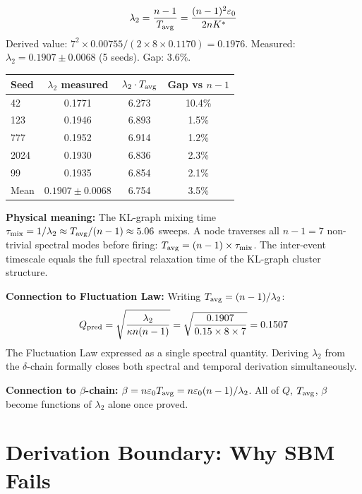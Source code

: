 \documentclass[12pt, a4paper]{article}
\begin{document}
\begin{keybox}[title={Spectral--Temporal Identity (Candidate, 3.6\% gap, 5 seeds)}]
\[
  \lambda_2 = \frac{n-1}{T_{\rm avg}} = \frac{(n-1)^2\varepsilon_0}{2nK^*}
\]
Derived value: $7^2\times 0.00755/(2\times 8\times 0.1170) = 0.1976$.
Measured: $\lambda_2=0.1907\pm 0.0068$ (5 seeds). Gap: 3.6\%.

\begin{center}
\renewcommand{\arraystretch}{1.5}
\begin{tabular}{lccc}
\toprule
Seed & $\lambda_2$ measured & $\lambda_2\cdot T_{\rm avg}$ & Gap vs $n-1$\\
\midrule
42   & 0.1771 & 6.273 & 10.4\% \\
123  & 0.1946 & 6.893 & 1.5\%  \\
777  & 0.1952 & 6.914 & 1.2\%  \\
2024 & 0.1930 & 6.836 & 2.3\%  \\
99   & 0.1935 & 6.854 & 2.1\%  \\
\midrule
Mean & $0.1907\pm 0.0068$ & 6.754 & 3.5\% \\
\bottomrule
\end{tabular}
\end{center}
\end{keybox}

\textbf{Physical meaning:} The KL-graph mixing time $\tau_{\rm mix}=1/\lambda_2\approx T_{\rm avg}/(n-1)\approx 5.06$ sweeps. A node traverses all $n-1=7$ non-trivial spectral modes before firing: $T_{\rm avg}=(n-1)\times\tau_{\rm mix}$. The inter-event timescale equals the full spectral relaxation time of the KL-graph cluster structure.

\textbf{Connection to Fluctuation Law:} Writing $T_{\rm avg}=(n-1)/\lambda_2$:
\[
  Q_{\rm pred} = \sqrt{\frac{\lambda_2}{\kappa n(n-1)}} = \sqrt{\frac{0.1907}{0.15\times 8\times 7}} = 0.1507
\]
The Fluctuation Law expressed as a single spectral quantity. Deriving $\lambda_2$ from the $\delta$-chain formally closes both spectral and temporal derivation simultaneously.

\textbf{Connection to $\beta$-chain:} $\beta=n\varepsilon_0 T_{\rm avg}=n\varepsilon_0(n-1)/\lambda_2$. All of $Q$, $T_{\rm avg}$, $\beta$ become functions of $\lambda_2$ alone once proved.

\section{Derivation Boundary: Why SBM Fails}
\end{document}
